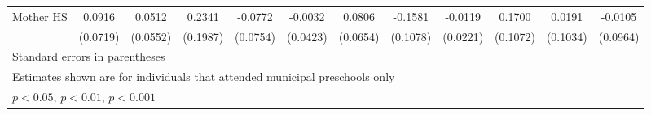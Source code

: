 \begin{table}[htbp]
\begin{tabular}{l*{11}{c}}
\addlinespace
Mother HS   &      0.0916         &      0.0512         &      0.2341         &     -0.0772         &     -0.0032         &      0.0806         &     -0.1581         &     -0.0119         &      0.1700         &      0.0191         &     -0.0105         \\
            &    (0.0719)         &    (0.0552)         &    (0.1987)         &    (0.0754)         &    (0.0423)         &    (0.0654)         &    (0.1078)         &    (0.0221)         &    (0.1072)         &    (0.1034)         &    (0.0964)         \\
\bottomrule
\multicolumn{12}{l}{\footnotesize Standard errors in parentheses}\\
\multicolumn{12}{l}{\footnotesize Estimates shown are for individuals that attended municipal preschools only}\\
\multicolumn{12}{l}{\footnotesize \sym{*} \(p<0.05\), \sym{**} \(p<0.01\), \sym{***} \(p<0.001\)}\\
\end{tabular}
\end{table}
